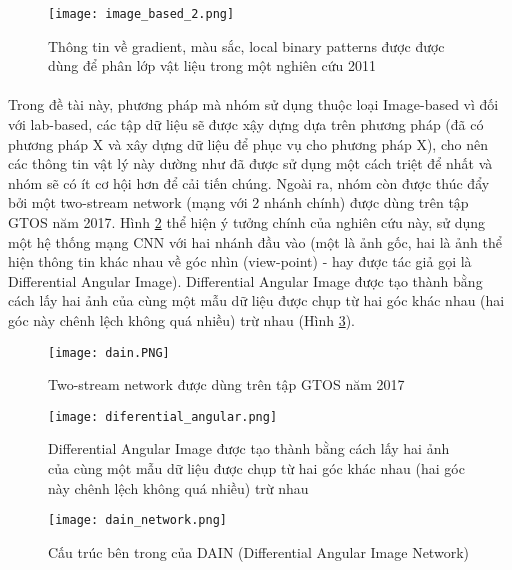 \begin{figure}[h!]
	\centering
	\captionsetup{width=0.9\textwidth}
	\texttt{[image: image\_based\_2.png]}
	\caption{Thông tin về gradient, màu sắc, local binary patterns được được dùng để phân lớp vật liệu trong một nghiên cứu 2011 \cite{hu2011toward}}
    \label{fig:image_based_2}
\end{figure}

\pagebreak
\paragraph*{}
Trong đề tài này, phương pháp mà nhóm sử dụng thuộc loại Image-based vì đối với lab-based, các tập dữ liệu sẽ được xậy dựng dựa trên phương pháp (đã có phương pháp X và xây dựng dữ liệu để phục vụ cho phương pháp X), cho nên các thông tin vật lý này dường như đã được sử dụng một cách triệt để nhất và nhóm sẽ có ít cơ hội hơn để cải tiến chúng. Ngoài ra, nhóm còn được thúc đẩy bởi một two-stream network (mạng với 2 nhánh chính) được dùng trên tập GTOS năm 2017\cite{xue2017differential}. Hình \ref{fig:dain} thể hiện ý tưởng chính của nghiên cứu này, sử dụng một hệ thống mạng CNN với hai nhánh đầu vào (một là ảnh gốc, hai là ảnh thể hiện thông tin khác nhau về góc nhìn (view-point) - hay được tác giả gọi là Differential Angular Image). Differential Angular Image được tạo thành bằng cách lấy hai ảnh của cùng một mẫu dữ liệu được chụp từ hai góc khác nhau (hai góc này chênh lệch không quá nhiều) trừ nhau (Hình \ref{fig:differential_angular}). 

\begin{figure}[h!]
	\centering
	\captionsetup{width=0.9\textwidth}
	\texttt{[image: dain.PNG]}
	\caption{Two-stream network được dùng trên tập GTOS năm 2017 \cite{xue2017differential}}
    \label{fig:dain}
\end{figure}

\begin{figure}[h!]
	\centering
	\captionsetup{width=0.9\textwidth}
	\texttt{[image: diferential\_angular.png]}
	\caption{Differential Angular Image được tạo thành bằng cách lấy hai ảnh của cùng một mẫu dữ liệu được chụp từ hai góc khác nhau (hai góc này chênh lệch không quá nhiều) trừ nhau \cite{xue2017differential}}
    \label{fig:differential_angular}
\end{figure}

\begin{figure}[h!]
	\centering
	\captionsetup{width=0.9\textwidth}
	\texttt{[image: dain\_network.png]}
	\caption{Cấu trúc bên trong của DAIN (Differential Angular Image Network) \cite{xue2017differential}}
    \label{fig:dain_network}
\end{figure}
